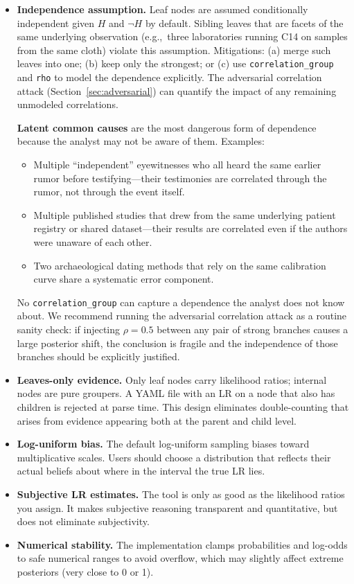 \documentclass[11pt,a4paper]{article}
\begin{document}
\begin{itemize}
\item \textbf{Independence assumption.} Leaf nodes are assumed
  conditionally independent given $H$ and $\neg H$ by default.  Sibling
  leaves that are facets of the same underlying observation
  (e.g.,\ three laboratories running C14 on samples from the same cloth)
  violate this assumption.  Mitigations: (a) merge such leaves into one;
  (b) keep only the strongest; or (c) use \texttt{correlation\_group} and
  \texttt{rho} to model the dependence explicitly.  The adversarial
  correlation attack (Section~\ref{sec:adversarial}) can quantify the
  impact of any remaining unmodeled correlations.

  \textbf{Latent common causes} are the most dangerous form of dependence
  because the analyst may not be aware of them.  Examples:
  \begin{itemize}
  \item Multiple ``independent'' eyewitnesses who all heard the same
    earlier rumor before testifying---their testimonies are correlated
    through the rumor, not through the event itself.
  \item Multiple published studies that drew from the same underlying
    patient registry or shared dataset---their results are correlated even
    if the authors were unaware of each other.
  \item Two archaeological dating methods that rely on the same calibration
    curve share a systematic error component.
  \end{itemize}
  No \texttt{correlation\_group} can capture a dependence the analyst does
  not know about.  We recommend running the adversarial correlation attack
  as a routine sanity check: if injecting $\rho = 0.5$ between any pair of
  strong branches causes a large posterior shift, the conclusion is fragile
  and the independence of those branches should be explicitly justified.

\item \textbf{Leaves-only evidence.} Only leaf nodes carry likelihood ratios;
  internal nodes are pure groupers.  A YAML file with an LR on a node that
  also has children is rejected at parse time.  This design eliminates
  double-counting that arises from evidence appearing both at the parent
  and child level.

\item \textbf{Log-uniform bias.} The default log-uniform sampling biases
  toward multiplicative scales. Users should choose a distribution that
  reflects their actual beliefs about where in the interval the true LR lies.

\item \textbf{Subjective LR estimates.} The tool is only as good as the
  likelihood ratios you assign. It makes subjective reasoning transparent
  and quantitative, but does not eliminate subjectivity.

\item \textbf{Numerical stability.} The implementation clamps probabilities
  and log-odds to safe numerical ranges to avoid overflow, which may
  slightly affect extreme posteriors (very close to 0 or 1).
\end{itemize}
\end{document}
